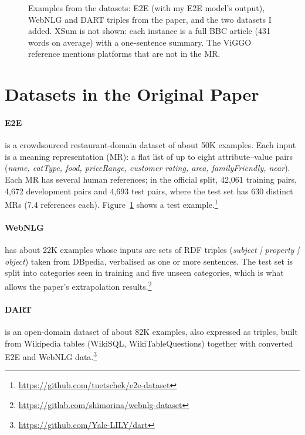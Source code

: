 \documentclass[11pt]{article}
\begin{document}
\begin{figure}[t]
\begin{minipage}[t]{0.49\textwidth}
\end{minipage}
\caption{Examples from the datasets: E2E (with my E2E model's output), WebNLG and DART triples from the paper, and the two datasets I added. XSum is not shown: each instance is a full BBC article (431 words on average) with a one-sentence summary. The ViGGO reference mentions platforms that are not in the MR.}
\label{fig:snippets}
\end{figure}

\section{Datasets in the Original Paper}

\paragraph{E2E} \citep{novikova-etal-2017-e2e} is a crowdsourced restaurant-domain dataset of about 50K examples. Each input is a meaning representation (MR): a flat list of up to eight attribute--value pairs (\textit{name, eatType, food, priceRange, customer rating, area, familyFriendly, near}). Each MR has several human references; in the official split, 42,061 training pairs, 4,672 development pairs and 4,693 test pairs, where the test set has 630 distinct MRs (7.4 references each). Figure~\ref{fig:snippets} shows a test example.\footnote{\url{https://github.com/tuetschek/e2e-dataset}}

\paragraph{WebNLG} \citep{gardent-etal-2017-webnlg} has about 22K examples whose inputs are sets of RDF triples (\textit{subject | property | object}) taken from DBpedia, verbalised as one or more sentences. The test set is split into categories seen in training and five unseen categories, which is what allows the paper's extrapolation results.\footnote{\url{https://gitlab.com/shimorina/webnlg-dataset}}

\paragraph{DART} \citep{nan-etal-2021-dart} is an open-domain dataset of about 82K examples, also expressed as triples, built from Wikipedia tables (WikiSQL, WikiTableQuestions) together with converted E2E and WebNLG data.\footnote{\url{https://github.com/Yale-LILY/dart}}
\end{document}
